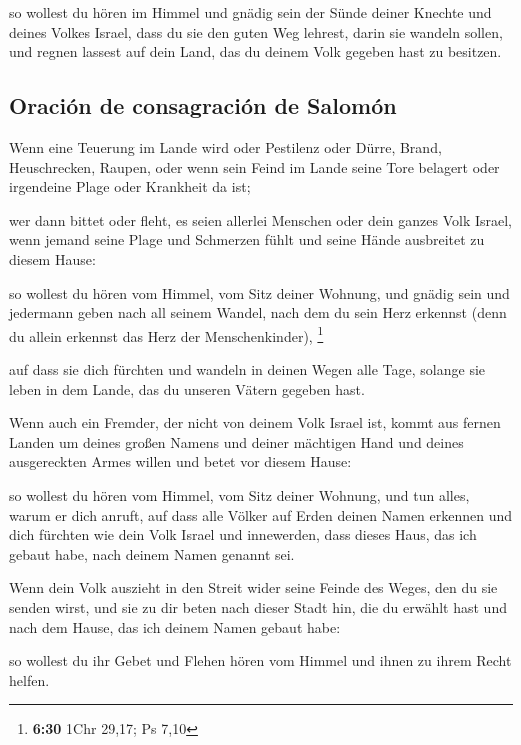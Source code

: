 so wollest du hören im Himmel und gnädig sein der Sünde
deiner Knechte und deines Volkes Israel, dass du sie den guten Weg
lehrest, darin sie wandeln sollen, und regnen lassest auf dein Land, das
du deinem Volk gegeben hast zu besitzen.

\hypertarget{oraciuxf3n-de-consagraciuxf3n-de-salomuxf3n}{%
\subsection{Oración de consagración de
Salomón}\label{oraciuxf3n-de-consagraciuxf3n-de-salomuxf3n}}

 Wenn eine Teuerung im Lande wird oder Pestilenz oder
Dürre, Brand, Heuschrecken, Raupen, oder wenn sein Feind im Lande seine
Tore belagert oder irgendeine Plage oder Krankheit da ist;

 wer dann bittet oder fleht, es seien allerlei Menschen
oder dein ganzes Volk Israel, wenn jemand seine Plage und Schmerzen
fühlt und seine Hände ausbreitet zu diesem Hause:

 so wollest du hören vom Himmel, vom Sitz deiner Wohnung,
und gnädig sein und jedermann geben nach all seinem Wandel, nach dem du
sein Herz erkennst (denn du allein erkennst das Herz der
Menschenkinder), \footnote{\textbf{6:30} 1Chr 29,17; Ps 7,10}

 auf dass sie dich fürchten und wandeln in deinen Wegen
alle Tage, solange sie leben in dem Lande, das du unseren Vätern gegeben
hast.

 Wenn auch ein Fremder, der nicht von deinem Volk Israel
ist, kommt aus fernen Landen um deines großen Namens und deiner
mächtigen Hand und deines ausgereckten Armes willen und betet vor diesem
Hause:

 so wollest du hören vom Himmel, vom Sitz deiner Wohnung,
und tun alles, warum er dich anruft, auf dass alle Völker auf Erden
deinen Namen erkennen und dich fürchten wie dein Volk Israel und
innewerden, dass dieses Haus, das ich gebaut habe, nach deinem Namen
genannt sei.

 Wenn dein Volk auszieht in den Streit wider seine Feinde
des Weges, den du sie senden wirst, und sie zu dir beten nach dieser
Stadt hin, die du erwählt hast und nach dem Hause, das ich deinem Namen
gebaut habe:

 so wollest du ihr Gebet und Flehen hören vom Himmel und
ihnen zu ihrem Recht helfen.

